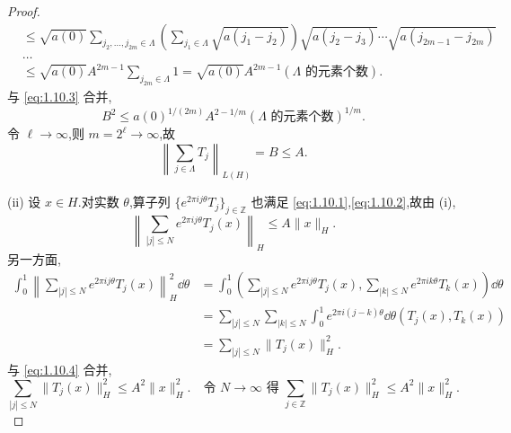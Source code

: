 \begin{proof}
\begin{align*}
& \leq \sqrt{a(0)}\displaystyle\sum_{j_{2}, \ldots, j_{2m} \in \Lambda}\left(\sum_{j_{1} \in \Lambda}\sqrt{a(j_{1} - j_{2})}\right)\sqrt{a(j_{2} - j_{3})}\cdots\sqrt{a(j_{2m-1} - j_{2m})} \\
& \ldots \\
& \leq \sqrt{a(0)}A^{2m-1}\sum_{j_{2m} \in \Lambda}1 = \sqrt{a(0)}A^{2m-1}(\Lambda \text{ 的元素个数}).
\end{align*}
与 \eqref{eq:1.10.3} 合并,
\begin{equation*}
B^{2} \leq a(0)^{1/(2m)}A^{2-1/m}(\Lambda \text{ 的元素个数})^{1/m}.
\end{equation*}
令 $\ell \to \infty$,则 $m = 2^{\ell} \to \infty$,故
\begin{equation*}
\left\| \sum_{j \in \Lambda}T_{j} \right\|_{L(H)} = B \leq A.
\end{equation*}

(ii) 设 $x \in H$.对实数 $\theta$,算子列 $\{e^{2\pi ij\theta}T_{j}\}_{j \in \mathbb{Z}}$ 也满足 \eqref{eq:1.10.1},\eqref{eq:1.10.2},故由 (i),
\begin{equation}\tag{1.10.4}
\left\| \sum_{|j| \leq N}e^{2\pi ij\theta}T_{j}(x) \right\|_{H} \leq A\| x \|_{H}.
\label{eq:1.10.4}\end{equation}
另一方面,
\begin{align*}
\displaystyle\int_{0}^{1}\left\| \sum_{|j| \leq N}e^{2\pi ij\theta}T_{j}(x) \right\|_{H}^{2}\dd\theta&= \displaystyle\int_{0}^{1}\left(\sum_{|j| \leq N}e^{2\pi ij\theta}T_{j}(x), \sum_{|k| \leq N}e^{2\pi ik\theta}T_{k}(x)\right)\dd\theta  \\
&= \displaystyle\sum_{|j| \leq N}\sum_{|k| \leq N}\int_{0}^{1}e^{2\pi i(j-k)\theta}\dd\theta\left(T_{j}(x), T_{k}(x)\right) \\
&= \displaystyle\sum_{|j| \leq N}\| T_{j}(x) \|_{H}^{2}.
\end{align*}
与 \eqref{eq:1.10.4} 合并,
\begin{equation*}
\sum_{|j| \leq N}\| T_{j}(x) \|_{H}^{2} \leq A^{2}\| x \|_{H}^{2}. \quad \text{令 } N \to \infty \text{ 得 } \sum_{j \in \mathbb{Z}}\| T_{j}(x) \|_{H}^{2} \leq A^{2}\| x \|_{H}^{2}.
\end{equation*}


\end{proof}
